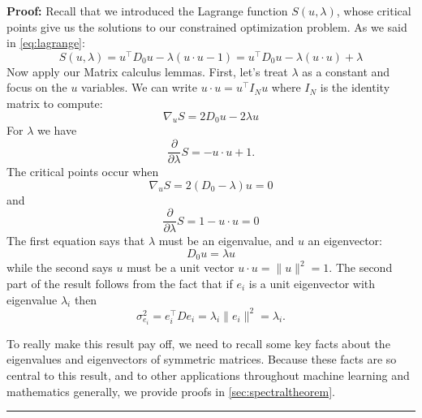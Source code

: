 \documentclass[
]{article}
\begin{document}
\textbf{Proof:} Recall that we introduced the Lagrange function
\(S(u,\lambda)\), whose critical points give us the solutions to our
constrained optimization problem. As we said in \cref{eq:lagrange}: \[
S(u,\lambda) = u^{\intercal}D_{0}u - \lambda(u\cdot u - 1) = u^{\intercal}D_{0}u -\lambda(u\cdot u) + \lambda
\] Now apply our Matrix calculus lemmas. First, let's treat \(\lambda\)
as a constant and focus on the \(u\) variables. We can write
\(u\cdot u = u^{\intercal} I_{N} u\) where \(I_{N}\) is the identity
matrix to compute: \[
\nabla_{u} S = 2D_{0}u -2\lambda u
\] For \(\lambda\) we have \[
\frac{\partial}{\partial \lambda}S = -u\cdot u +1.
\] The critical points occur when \[
\nabla_{u} S = 2(D_{0}-\lambda)u = 0
\] and \[
\frac{\partial}{\partial \lambda}S = 1-u\cdot u = 0
\] The first equation says that \(\lambda\) must be an eigenvalue, and
\(u\) an eigenvector: \[
D_{0}u = \lambda u
\] while the second says \(u\) must be a unit vector
\(u\cdot u=\|u\|^2=1\). The second part of the result follows from the
fact that if \(e_{i}\) is a unit eigenvector with eigenvalue
\(\lambda_{i}\) then \[
\sigma_{e_{i}}^2 = e_{i}^{\intercal}De_{i} = \lambda_{i}\|e_{i}\|^2=\lambda_{i}.
\]

To really make this result pay off, we need to recall some key facts
about the eigenvalues and eigenvectors of symmetric matrices. Because
these facts are so central to this result, and to other applications
throughout machine learning and mathematics generally, we provide proofs
in \cref{sec:spectraltheorem}.

\begin{center}\rule{0.5\linewidth}{0.5pt}\end{center}
\end{document}
